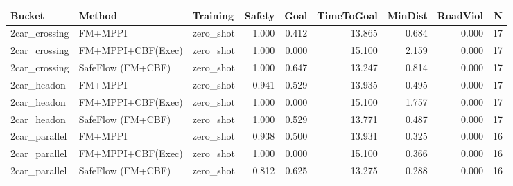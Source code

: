 \begin{tabular}{lllrrrrrr}
\toprule
Bucket & Method & Training & Safety & Goal & TimeToGoal & MinDist & RoadViol & N \\
\midrule
2car_crossing & FM+MPPI & zero_shot & 1.000 & 0.412 & 13.865 & 0.684 & 0.000 & 17 \\
2car_crossing & FM+MPPI+CBF(Exec) & zero_shot & 1.000 & 0.000 & 15.100 & 2.159 & 0.000 & 17 \\
2car_crossing & SafeFlow (FM+CBF) & zero_shot & 1.000 & 0.647 & 13.247 & 0.814 & 0.000 & 17 \\
2car_headon & FM+MPPI & zero_shot & 0.941 & 0.529 & 13.935 & 0.495 & 0.000 & 17 \\
2car_headon & FM+MPPI+CBF(Exec) & zero_shot & 1.000 & 0.000 & 15.100 & 1.757 & 0.000 & 17 \\
2car_headon & SafeFlow (FM+CBF) & zero_shot & 1.000 & 0.529 & 13.771 & 0.487 & 0.000 & 17 \\
2car_parallel & FM+MPPI & zero_shot & 0.938 & 0.500 & 13.931 & 0.325 & 0.000 & 16 \\
2car_parallel & FM+MPPI+CBF(Exec) & zero_shot & 1.000 & 0.000 & 15.100 & 0.366 & 0.000 & 16 \\
2car_parallel & SafeFlow (FM+CBF) & zero_shot & 0.812 & 0.625 & 13.275 & 0.288 & 0.000 & 16 \\
\bottomrule
\end{tabular}
